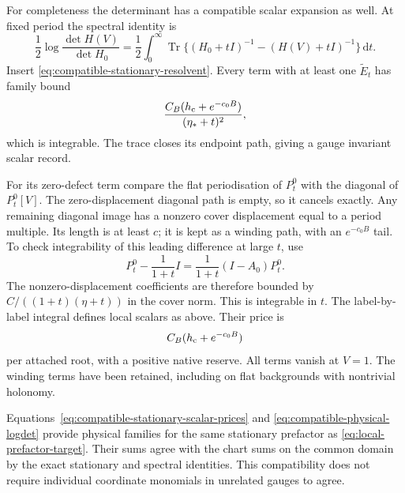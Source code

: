 \documentclass[11pt,reqno]{amsart}
\numberwithin{equation}{section}
\theoremstyle{definition}
\theoremstyle{remark}
\newcommand{\dd}{\mathrm d}
\begin{document}
For completeness the determinant has
a compatible scalar expansion as well.
At fixed period the spectral identity is
\begin{equation}
 \frac12\log\frac{\det H(V)}{\det H_0}
   =\frac12\int_0^\infty
        \operatorname{Tr}
          \{(H_0+tI)^{-1}-(H(V)+tI)^{-1}\}\,\dd t .
 \label{eq:compatible-physical-logdet}
\end{equation}
Insert \eqref{eq:compatible-stationary-resolvent}.
Every term with at least one
\(\widetilde E_t\) has family bound
\[
             \frac{C_B(h_{\rm c}+e^{-c_0B})}
                                      {(\eta_*+t)^2},
\]
which is integrable. The trace closes
its endpoint path, giving a gauge
invariant scalar record.

For its zero-defect term compare the
flat periodisation of \(P_t^0\) with
the diagonal of \(P_t^0[V]\).
The zero-displacement diagonal path
is empty, so it cancels exactly.
Any remaining diagonal image has a
nonzero cover displacement equal to
a period multiple. Its length is at
least \(c\); it is kept as a winding
path, with an \(e^{-c_0B}\) tail.
To check integrability of this leading
difference at large \(t\), use
\[
 P_t^0-\frac1{1+t}I
           =\frac1{1+t}(I-A_0)P_t^0 .
\]
The nonzero-displacement coefficients
are therefore bounded by
\(C/((1+t)(\eta+t))\) in the cover
norm. This is integrable in \(t\).
The label-by-label integral defines
local scalars as above. Their price is
\begin{equation}
                 C_B(h_{\rm c}+e^{-c_0B})
 \label{eq:compatible-physical-logdet-price}
\end{equation}
per attached root, with a positive
native reserve.
All terms vanish at \(V=1\).
The winding terms have been retained,
including on flat backgrounds with
nontrivial holonomy.

Equations~\eqref{eq:compatible-stationary-scalar-prices}
and \eqref{eq:compatible-physical-logdet}
provide physical families for the same
stationary prefactor as
\eqref{eq:local-prefactor-target}.
Their sums agree with the chart sums
on the common domain by the exact
stationary and spectral identities.
This compatibility does not require
individual coordinate monomials in
unrelated gauges to agree.
\end{document}
